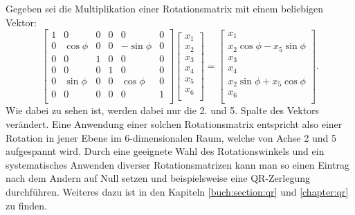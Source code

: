 \begin{beispiel}
Gegeben sei die Multiplikation einer Rotationsmatrix mit einem beliebigen Vektor:
	\begin{equation}
	\begin{bmatrix}
	1 & 0 & 0 & 0 & 0 & 0 \\
	0 & \cos\phi & 0 & 0 & -\sin\phi & 0 \\
	0 & 0 & 1 & 0 & 0 & 0 \\
	0 & 0 & 0 & 1 & 0 & 0 \\
	0 & \sin\phi & 0 & 0 & \cos\phi & 0 \\
	0 & 0 & 0 & 0 & 0 & 1 \\
	\end{bmatrix}
	\begin{bmatrix}
	x_{1}\\
	x_{2}\\
	x_{3}\\
	x_{4}\\
	x_{5}\\
	x_{6}\\
	\end{bmatrix}
	=
	\begin{bmatrix}
	x_{1}\\
	x_{2}\cos\phi-x_{5}\sin\phi\\
	x_{3}\\
	x_{4}\\
	x_{2}\sin\phi+x_{5}\cos\phi\\
	x_{6}\\
	\end{bmatrix}.
	\end{equation}	
Wie dabei zu sehen ist, werden dabei nur die 2. und 5. Spalte des Vektors verändert.
Eine Anwendung einer solchen Rotationsmatrix entspricht also einer Rotation in jener Ebene im 6-dimensionalen Raum, welche von Achse 2 und 5 aufgespannt wird.
Durch eine geeignete Wahl des Rotationswinkels und ein systematisches Anwenden diverser Rotationsmatrizen kann man so einen Eintrag nach dem Andern auf Null setzen und beispielsweise eine QR-Zerlegung durchführen. \cite{francis:QR_Zerlegung} 
Weiteres dazu ist in den Kapiteln \ref{buch:section:qr} und \ref{chapter:qr} zu finden.
\end{beispiel}

